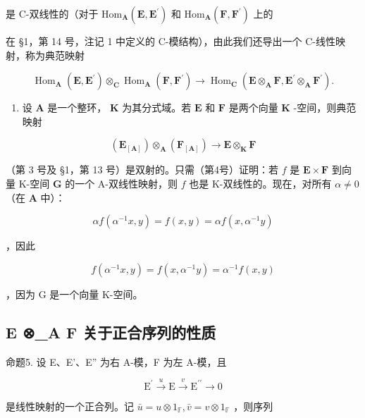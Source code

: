 是 C-双线性的（对于 \(\mathrm{Hom}_{\mathbf{A}}(\mathbf{E},\mathbf{E}^{\prime})\) 和 \(\mathrm{Hom}_{\mathbf{A}}(\mathbf{F},\mathbf{F}^{\prime})\) 上的

在 §1，第 14 号，注记 1 中定义的 C-模结构），由此我们还导出一个 C-线性映射，称为典范映射

\[
\operatorname{Hom} _ {\mathbf {A}} (\mathbf {E}, \mathbf {E} ^ {\prime}) \otimes_ {\mathbf {C}} \operatorname{Hom} _ {\mathbf {A}} (\mathbf {F}, \mathbf {F} ^ {\prime}) \rightarrow \operatorname{Hom} _ {\mathbf {C}} (\mathbf {E} \otimes_ {\mathbf {A}} \mathbf {F}, \mathbf {E} ^ {\prime} \otimes_ {\mathbf {A}} \mathbf {F} ^ {\prime}).\tag{13}
\]

\begin{enumerate}
\def\labelenumi{(\arabic{enumi})}
\setcounter{enumi}{2}
\tightlist
\item
  设 \(\mathbf{A}\) 是一个整环， \(\mathbf{K}\) 为其分式域。若 \(\mathbf{E}\) 和 \(\mathbf{F}\) 是两个向量 \(\mathbf{K}\) -空间，则典范映射
\end{enumerate}

\[
\left(\mathbf {E} _ {[ \mathbf {A} ]}\right) \otimes_ {\mathbf {A}} \left(\mathbf {F} _ {[ \mathbf {A} ]}\right)\rightarrow \mathbf {E} \otimes_ {\mathbf {K}} \mathbf {F}
\]

（第 3 号及 §1，第 13 号）是双射的。只需（第4号）证明：若 \(f\) 是 \(\mathbf{E} \times \mathbf{F}\) 到向量 K-空间 \(\mathbf{G}\) 的一个 A-双线性映射，则 \(f\) 也是 K-双线性的。现在，对所有 \(\alpha \neq 0\) （在 \(\mathbf{A}\) 中）：

\[
\alpha f (\alpha^ {- 1} x, y) = f (x, y) = \alpha f (x, \alpha^ {- 1} y)
\]

，因此

\[
f (\alpha^ {- 1} x, y) = f (x, \alpha^ {- 1} y) = \alpha^ {- 1} f (x, y)
\]

，因为 G 是一个向量 K-空间。

\subsection{E ⊗\_A F 关于正合序列的性质}

命题5. 设 E、E'、E'' 为右 A-模，F 为左 A-模，且

\[
\mathrm{E} ^ {\prime} \stackrel {u} {\longrightarrow} \mathrm{E} \stackrel {v} {\longrightarrow} \mathrm{E} ^ {\prime \prime} \longrightarrow 0\tag{14}
\]

是线性映射的一个正合列。记 \(\bar{u} = u \otimes 1_{\mathbb{F}}, \bar{v} = v \otimes 1_{\mathbb{F}}\) ，则序列

